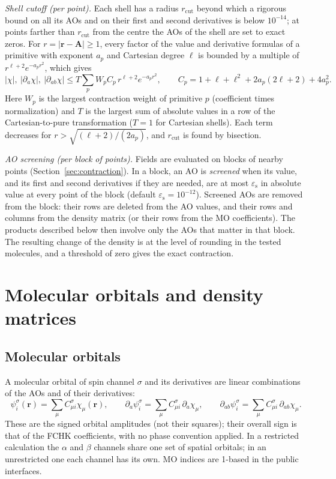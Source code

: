 \documentclass[11pt,a4paper]{article}
\begin{document}
\emph{Shell cutoff (per point).} Each shell has a radius $r_{\mathrm{cut}}$
beyond which a rigorous bound on all its AOs and on their first and second
derivatives is below $10^{-14}$; at points farther than $r_{\mathrm{cut}}$
from the centre the AOs of the shell are set to exact zeros. For
$r=|\mathbf r-\mathbf A|\ge1$, every factor of the value and derivative
formulas of a primitive with exponent $a_p$ and Cartesian degree $\ell$ is
bounded by a multiple of $r^{\ell+2}e^{-a_pr^2}$, which gives
\begin{equation}
 |\chi|,\ |\partial_a\chi|,\ |\partial_{ab}\chi|\le
 T\sum_p W_p C_p\, r^{\ell+2}e^{-a_pr^2},\qquad
 C_p=1+\ell+\ell^2+2a_p(2\ell+2)+4a_p^2.
\end{equation}
Here $W_p$ is the largest contraction weight of primitive $p$ (coefficient
times normalization) and $T$ is the largest sum of absolute values in a row
of the Cartesian-to-pure transformation ($T=1$ for Cartesian shells). Each
term decreases for $r>\sqrt{(\ell+2)/(2a_p)}$, and $r_{\mathrm{cut}}$ is
found by bisection.

\emph{AO screening (per block of points).} Fields are evaluated on blocks
of nearby points (Section~\ref{sec:contraction}). In a block, an AO is
\emph{screened} when its value, and its first and second derivatives if
they are needed, are at most $\varepsilon_{\mathrm s}$ in absolute value at
every point of the block (default $\varepsilon_{\mathrm s}=10^{-12}$).
Screened AOs are removed from the block: their rows are deleted from the
AO values, and their rows and columns from the density matrix (or their
rows from the MO coefficients). The products described below then involve
only the AOs that matter in that block. The resulting change of the density
is at the level of rounding in the tested molecules, and a threshold of
zero gives the exact contraction.

\section{Molecular orbitals and density matrices}\label{sec:mos}

\subsection{Molecular orbitals}
A molecular orbital of spin channel $\sigma$ and its derivatives are linear
combinations of the AOs and of their derivatives:
\begin{equation}
 \psi_i^\sigma(\mathbf r)=\sum_\mu C_{\mu i}^\sigma\chi_\mu(\mathbf r),\qquad
 \partial_a\psi_i^\sigma=\sum_\mu C_{\mu i}^\sigma\,\partial_a\chi_\mu,\qquad
 \partial_{ab}\psi_i^\sigma=\sum_\mu C_{\mu i}^\sigma\,\partial_{ab}\chi_\mu.
\end{equation}
These are the signed orbital amplitudes (not their squares); their overall
sign is that of the FCHK coefficients, with no phase convention applied.
In a restricted calculation the $\alpha$ and $\beta$ channels share one
set of spatial orbitals; in an unrestricted one each channel has its own.
MO indices are 1-based in the public interfaces.
\end{document}
